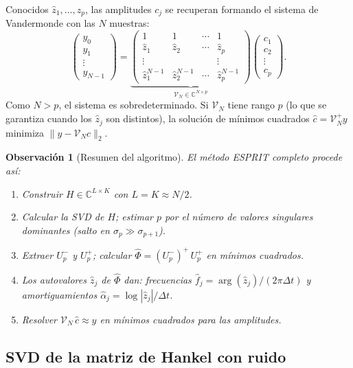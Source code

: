 \documentclass[12pt]{article}
\newtheorem{remark}[theorem]{Observación}
\newcommand{\C}{\mathbb{C}}
\begin{document}
Conocidos $\hat{z}_1,\ldots,\hat{z}_p$, las amplitudes $c_j$ se recuperan formando el sistema de Vandermonde con las $N$ muestras:
\[
  \begin{pmatrix} y_0 \\ y_1 \\ \vdots \\ y_{N-1} \end{pmatrix}
  =
  \underbrace{\begin{pmatrix}
    1 & 1 & \cdots & 1 \\
    \hat{z}_1 & \hat{z}_2 & \cdots & \hat{z}_p \\
    \vdots & & & \vdots \\
    \hat{z}_1^{N-1} & \hat{z}_2^{N-1} & \cdots & \hat{z}_p^{N-1}
  \end{pmatrix}}_{\mathcal{V}_N \in \C^{N \times p}}
  \begin{pmatrix} c_1 \\ c_2 \\ \vdots \\ c_p \end{pmatrix}.
\]
Como $N > p$, el sistema es sobredeterminado. Si $\mathcal{V}_N$ tiene rango $p$ (lo que se garantiza cuando los $\hat{z}_j$ son distintos), la solución de mínimos cuadrados $\hat{c} = \mathcal{V}_N^+ y$ minimiza $\|y - \mathcal{V}_N c\|_2$.

\begin{remark}[Resumen del algoritmo]
El método ESPRIT completo procede así:
\begin{enumerate}
  \item Construir $H \in \C^{L\times K}$ con $L = K \approx N/2$.
  \item Calcular la SVD de $H$; estimar $p$ por el número de valores singulares dominantes (salto en $\sigma_p \gg \sigma_{p+1}$).
  \item Extraer $U_p^-$ y $U_p^+$; calcular $\hat{\Phi} = (U_p^-)^+\, U_p^+$ en mínimos cuadrados.
  \item Los autovalores $\hat{z}_j$ de $\hat{\Phi}$ dan: frecuencias $\hat{f}_j = \arg(\hat{z}_j)/(2\pi\Delta t)$ y amortiguamientos $\hat{\alpha}_j = \log|\hat{z}_j|/\Delta t$.
  \item Resolver $\mathcal{V}_N\, \hat{c} \approx y$ en mínimos cuadrados para las amplitudes.
\end{enumerate}
\end{remark}

\subsection{SVD de la matriz de Hankel con ruido}
\end{document}
